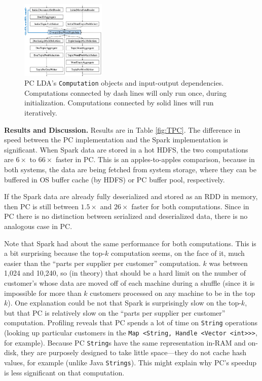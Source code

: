\begin{figure}
\centering
\includegraphics[width=0.36\textwidth]{lda-query-graph.pdf}
  \caption{\label{fig:lda-query-graph} PC LDA's \texttt{Computation} objects and input-output dependencies. Computations
    connected by dash lines will only run once, during  
    initialization. Computations connected by solid lines will run iteratively.}
\vspace{-20 pt}
\end{figure}

\vspace{5pt}
\noindent
\textbf{Results and Discussion.} Results are in Table \ref{fig:TPC}.  The difference in speed between the PC implementation and the Spark implementation
is significant.
When Spark data
are stored in
a hot HDFS, the two computations are $6\times$ to $66\times$ faster in PC.  
This is an apples-to-apples comparison, because in both systems, the data are being fetched from system storage, where they
can be buffered in OS buffer cache (by HDFS) or PC buffer pool, respectively.

If the Spark data are already
fully deserialized and stored as an RDD in memory, then PC is still 
between $1.5\times$ and $26\times$ faster
for both computations. Since in PC there is no distinction between
serialized and deserialized data, there is no analogous case in PC. 

Note that Spark had about the same performance for both computations.  This is
a bit surprising because the top-$k$ computation seems, on the face of it, much easier 
than the ``parts per supplier per customer'' computation.  $k$ was between 1,024 and 10,240, so (in theory) that should be
a hard limit on the number of customer's whose data are moved off of each machine during a shuffle 
(since it is impossible for more than $k$
customers processed on any machine to be in the top $k$).  One explanation could be not that Spark is surprisingly slow on the
top-$k$, but that PC is relatively slow on the ``parts per supplier per customer'' computation.  Profiling reveals that PC spends
a lot of time on \texttt{String} operations (looking up particular customers in the
\texttt{Map <String, Handle <Vector <int}\texttt{>}\texttt{>}\texttt{>}, for example).  
Because PC \texttt{String}s have the same representation in-RAM and on-disk, they are purposely designed to take little
space---they do not cache hash values, for example (unlike Java \texttt{Strings}).  This might explain why PC's speedup is
less significant on that computation.

